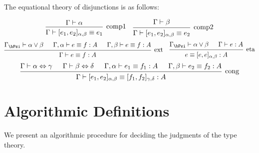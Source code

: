\documentclass{article}
\begin{document}
\begin{definition}
  The equational theory of disjunctions is as follows:

  \[
    \begin{prooftree}
            \hypo{\Gamma \vdash \alpha}
            \infer1[comp1]{\Gamma \vdash [e_{1}, e_{2}]_{\alpha, \beta} \equiv e_{1}}
    \end{prooftree}
    \quad
    \begin{prooftree}
        \hypo{\Gamma \vdash \beta}
        \infer1[comp2]{\Gamma \vdash [e_{1}, e_{2}]_{\alpha, \beta} \equiv e_{2}}
    \end{prooftree}
  \]
  \[
      \begin{prooftree}
        \hypo{\Gamma_{\bPsi} \vdash \alpha \lor \beta}
        \hypo{\Gamma, \alpha \vdash e \equiv f : A}
        \hypo{\Gamma, \beta \vdash e \equiv f : A}
        \infer3[ext]{\Gamma \vdash e \equiv f : A}
    \end{prooftree}
    \quad
    \begin{prooftree}
        \hypo{\Gamma_{\bPsi} \vdash \alpha \lor \beta}
        \hypo{\Gamma \vdash e : A}
        \infer2[eta]{e \equiv [e, e]_{\alpha, \beta} : A}
    \end{prooftree}
  \]
  \[
    \begin{prooftree}
        \hypo{\Gamma \vdash \alpha \Leftrightarrow \gamma}
        \hypo{\Gamma \vdash \beta \Leftrightarrow \delta}
        \hypo{\Gamma, \alpha \vdash e_{1} \equiv f_{1} : A}
        \hypo{\Gamma, \beta \vdash e_{2} \equiv f_{2} : A}
        \infer4[cong]{\Gamma \vdash [e_{1}, e_2]_{\alpha, \beta} \equiv [f_{1}, f_{2}]_{\gamma, \delta} : A}
    \end{prooftree}
  \]



\end{definition}





\section{Algorithmic Definitions}

We present an algorithmic procedure for deciding the judgments of the type theory.
\end{document}
